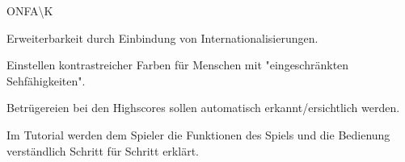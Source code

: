 \begin{ids}{\gls{ONFA\K}}

 	\id[110] Erweiterbarkeit durch Einbindung von Internationalisierungen.
 	
 	\id[120] Einstellen kontrastreicher Farben für Menschen mit "eingeschränkten Sehfähigkeiten".
 	
  	\id[130] Betrügereien bei den Highscores sollen automatisch erkannt/ersichtlich werden.
  	
  	\id[140] Im Tutorial werden dem Spieler die Funktionen des Spiels und die Bedienung verständlich Schritt für Schritt erklärt.  
	
\end{ids}

~\\